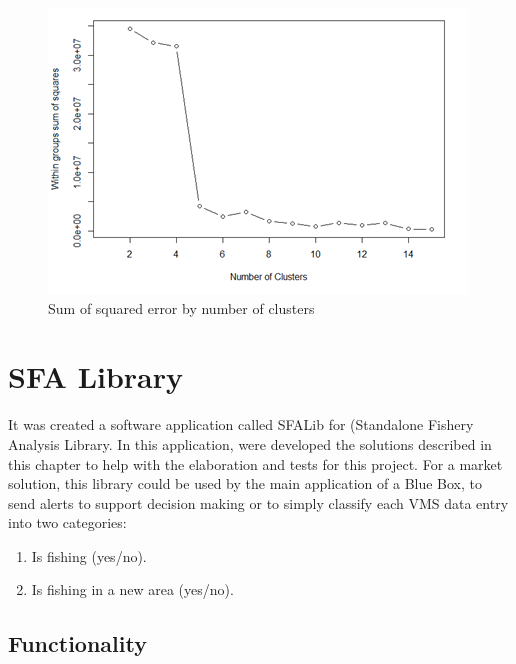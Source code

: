 \begin{figure}[H]
\centering
\includegraphics[width=0.8\linewidth]{Chapters/img/elbow_method.png}
\caption{Sum of squared error by number of clusters}
\label{fig:elbow_method}
\end{figure}






\section{SFA Library} %
\label{sub:sfa_library}

It was created a software application called SFALib for (Standalone Fishery Analysis Library. In this application, were developed the solutions described in this chapter to help with the elaboration and tests for this project. For a market solution, this library could be used by the main application of a Blue Box, to send alerts to support decision making or to simply classify each VMS data entry into two categories:
\begin{enumerate}
\item Is fishing (yes/no).
\item Is fishing in a new area (yes/no).
\end{enumerate}



\subsection{Functionality} %
\label{sub:functionality}

